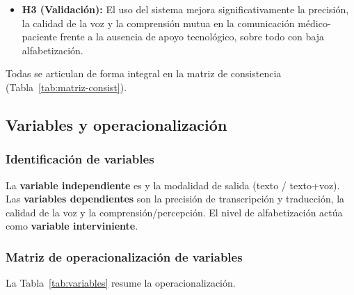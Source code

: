 \begin{bloqueObsDos}
\begin{itemize}
  \item \textbf{H3 (Validaci{\'o}n):} El uso del sistema mejora significativamente la precisi{\'o}n, la calidad de la voz y la comprensi{\'o}n mutua en la comunicaci{\'o}n m{\'e}dico-paciente frente a la ausencia de apoyo tecnol{\'o}gico, sobre todo con baja alfabetizaci{\'o}n.
\end{itemize}
\noindent {} Todas se articulan de forma integral en la
matriz de consistencia (Tabla~\ref{tab:matriz-consist}).
\end{bloqueObsDos}

\subsection{Variables y operacionalizaci{\'o}n}

\subsubsection{Identificaci{\'o}n de variables}
La \textbf{variable independiente} es  y la
modalidad de salida (texto / texto+voz). Las \textbf{variables dependientes} son la precisi{\'o}n de
transcripci{\'o}n y traducci{\'o}n, la calidad de la voz y la comprensi{\'o}n/percepci{\'o}n. El
nivel de alfabetizaci{\'o}n act{\'u}a como \textbf{variable interviniente}.

\subsubsection{Matriz de operacionalizaci{\'o}n de variables}
La Tabla~\ref{tab:variables} resume la operacionalizaci{\'o}n.

